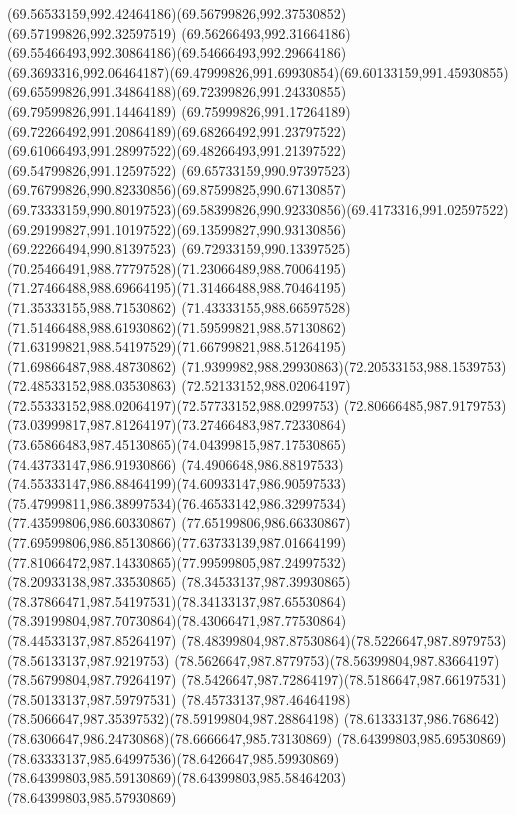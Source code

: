 {{	\curveto(69.56533159,992.42464186)(69.56799826,992.37530852)(69.57199826,992.32597519)
	\curveto(69.56266493,992.31664186)(69.55466493,992.30864186)(69.54666493,992.29664186)
	\curveto(69.3693316,992.06464187)(69.47999826,991.69930854)(69.60133159,991.45930855)
	\curveto(69.65599826,991.34864188)(69.72399826,991.24330855)(69.79599826,991.14464189)
	\curveto(69.75999826,991.17264189)(69.72266492,991.20864189)(69.68266492,991.23797522)
	\curveto(69.61066493,991.28997522)(69.48266493,991.21397522)(69.54799826,991.12597522)
	\curveto(69.65733159,990.97397523)(69.76799826,990.82330856)(69.87599825,990.67130857)
	\curveto(69.73333159,990.80197523)(69.58399826,990.92330856)(69.4173316,991.02597522)
	\curveto(69.29199827,991.10197522)(69.13599827,990.93130856)(69.22266494,990.81397523)
	\curveto(69.72933159,990.13397525)(70.25466491,988.77797528)(71.23066489,988.70064195)
	\curveto(71.27466488,988.69664195)(71.31466488,988.70464195)(71.35333155,988.71530862)
	\curveto(71.43333155,988.66597528)(71.51466488,988.61930862)(71.59599821,988.57130862)
	\curveto(71.63199821,988.54197529)(71.66799821,988.51264195)(71.69866487,988.48730862)
	\curveto(71.9399982,988.29930863)(72.20533153,988.1539753)(72.48533152,988.03530863)
	\curveto(72.52133152,988.02064197)(72.55333152,988.02064197)(72.57733152,988.0299753)
	\curveto(72.80666485,987.9179753)(73.03999817,987.81264197)(73.27466483,987.72330864)
	\curveto(73.65866483,987.45130865)(74.04399815,987.17530865)(74.43733147,986.91930866)
	\curveto(74.4906648,986.88197533)(74.55333147,986.88464199)(74.60933147,986.90597533)
	\curveto(75.47999811,986.38997534)(76.46533142,986.32997534)(77.43599806,986.60330867)
	\curveto(77.65199806,986.66330867)(77.69599806,986.85130866)(77.63733139,987.01664199)
	\curveto(77.81066472,987.14330865)(77.99599805,987.24997532)(78.20933138,987.33530865)
	\curveto(78.34533137,987.39930865)(78.37866471,987.54197531)(78.34133137,987.65530864)
	\curveto(78.39199804,987.70730864)(78.43066471,987.77530864)(78.44533137,987.85264197)
	\curveto(78.48399804,987.87530864)(78.5226647,987.8979753)(78.56133137,987.9219753)
	\curveto(78.5626647,987.8779753)(78.56399804,987.83664197)(78.56799804,987.79264197)
	\curveto(78.5426647,987.72864197)(78.5186647,987.66197531)(78.50133137,987.59797531)
	\curveto(78.45733137,987.46464198)(78.5066647,987.35397532)(78.59199804,987.28864198)
	\curveto(78.61333137,986.768642)(78.6306647,986.24730868)(78.6666647,985.73130869)
	\curveto(78.64399803,985.69530869)(78.63333137,985.64997536)(78.6426647,985.59930869)
	\curveto(78.64399803,985.59130869)(78.64399803,985.58464203)(78.64399803,985.57930869)
}}
